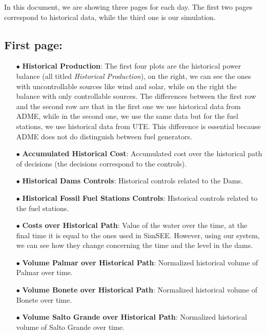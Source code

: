 \documentclass[12pt]{article}
\theoremstyle{definition}
\theoremstyle{remark}
\begin{document}
In this document, we are showing three pages for each day. The first two pages correspond to historical data, while the third one is our simulation.

\subsection*{First page:}

\begin{enumerate}

\item[$\bullet$] \textbf{Historical Production}: The first four plots are the historical power balance (all titled \emph{Historical Production}), on the right, we can see the ones with uncontrollable sources like wind and solar, while on the right the balance with only controllable sources. The differences between the first row and the second row are that in the first one we use historical data from ADME, while in the second one, we use the same data but for the fuel stations, we use historical data from UTE. This difference is essential because ADME does not do distinguish between fuel generators.

\item[$\bullet$] \textbf{Accumulated Historical Cost}: Accumulated cost over the historical path of decisions (the decisions correspond to the controls).

\item[$\bullet$] \textbf{Historical Dams Controls}: Historical controls related to the Dams.

\item[$\bullet$] \textbf{Historical Fossil Fuel Stations Controls}: Historical controls related to the fuel stations.

\item[$\bullet$] \textbf{Costs over Historical Path}: Value of the water over the time, at the final time it is equal to the ones used in SimSEE. However, using our system, we can see how they change concerning the time and the level in the dams.

\item[$\bullet$] \textbf{Volume Palmar over Historical Path}: Normalized historical volume of Palmar over time.

\item[$\bullet$] \textbf{Volume Bonete over Historical Path}: Normalized historical volume of Bonete over time.

\item[$\bullet$] \textbf{Volume Salto Grande over Historical Path}: Normalized historical volume of Salto Grande over time.


\end{enumerate}
\end{document}

